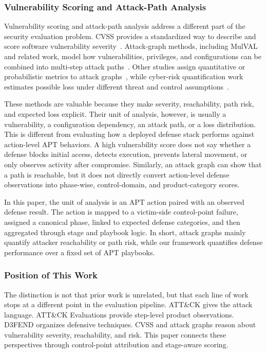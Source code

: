 \subsubsection{Vulnerability Scoring and Attack-Path Analysis}

Vulnerability scoring and attack-path analysis address a different part of the security evaluation problem. CVSS provides a standardized way to describe and score software vulnerability severity~\cite{mell2007common,first2019cvss31}. Attack-graph methods, including MulVAL and related work, model how vulnerabilities, privileges, and configurations can be combined into multi-step attack paths~\cite{ou2005mulval,ou2006scalable}. Other studies assign quantitative or probabilistic metrics to attack graphs~\cite{wang2007measuring,wang2008probabilistic,frigault2008dynamic}, while cyber-risk quantification work estimates possible loss under different threat and control assumptions~\cite{erola2022system}.

These methods are valuable because they make severity, reachability, path risk, and expected loss explicit. Their unit of analysis, however, is usually a vulnerability, a configuration dependency, an attack path, or a loss distribution. This is different from evaluating how a deployed defense stack performs against action-level APT behaviors. A high vulnerability score does not say whether a defense blocks initial access, detects execution, prevents lateral movement, or only observes activity after compromise. Similarly, an attack graph can show that a path is reachable, but it does not directly convert action-level defense observations into phase-wise, control-domain, and product-category scores.

In this paper, the unit of analysis is an APT action paired with an observed defense result. The action is mapped to a victim-side control-point failure, assigned a canonical phase, linked to expected defense categories, and then aggregated through stage and playbook logic. In short, attack graphs mainly quantify attacker reachability or path risk, while our framework quantifies defense performance over a fixed set of APT playbooks.

\subsubsection{Position of This Work}

The distinction is not that prior work is unrelated, but that each line of work stops at a different point in the evaluation pipeline. ATT\&CK gives the attack language. ATT\&CK Evaluations provide step-level product observations. D3FEND organizes defensive techniques. CVSS and attack graphs reason about vulnerability severity, reachability, and risk. This paper connects these perspectives through control-point attribution and stage-aware scoring.

